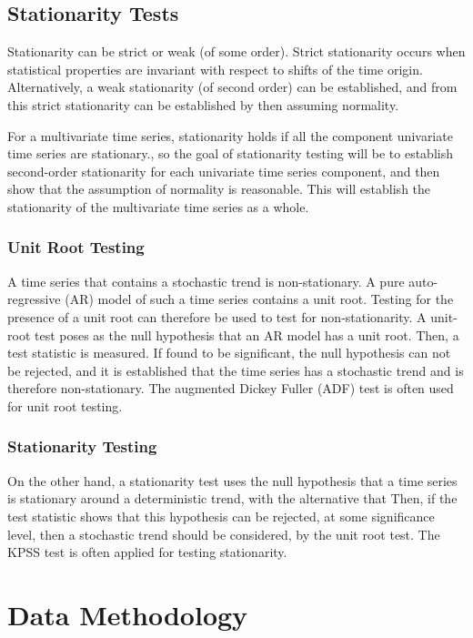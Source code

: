 \documentclass[a4paper]{scrartcl}
\begin{document}
\subsection*{Stationarity Tests}
Stationarity can be strict or weak (of some order). Strict stationarity occurs when statistical properties are invariant with respect to shifts of the time origin\cite{moon2000mathematical}. Alternatively, a weak stationarity (of second order) can be established, and from this strict stationarity can be established by then assuming normality\cite{box_jenkins_reinsel_2008}.

For a multivariate time series, stationarity holds if all the component univariate time series are stationary.\cite{yang2005stationarity}, so the goal of stationarity testing will be to establish second-order stationarity for each univariate time series component, and then show that the assumption of normality is reasonable. This will establish the stationarity of the multivariate time series as a whole.

\subsubsection*{Unit Root Testing}
A time series that contains a stochastic trend is non-stationary. A pure auto-regressive (AR) model of such a time series contains a unit root\cite{franses1998time}. Testing for the presence of a unit root can therefore be used to test for non-stationarity. A unit-root test poses as the null hypothesis that an AR model has a unit root. Then, a test statistic is measured. If found to be significant, the null hypothesis can not be rejected, and it is established that the time series has a stochastic trend and is therefore non-stationary. The augmented Dickey Fuller (ADF) test is often used for unit root testing.

\subsubsection*{Stationarity Testing}
On the other hand, a stationarity test uses the null hypothesis that a time series is stationary around a deterministic trend, with the alternative that  Then, if the test statistic shows that this hypothesis can be rejected, at some significance level, then a stochastic trend should be considered, by the unit root test. The KPSS test is often applied for testing stationarity.

\section*{Data Methodology}
\label{sec:data_methodology}
\end{document}
